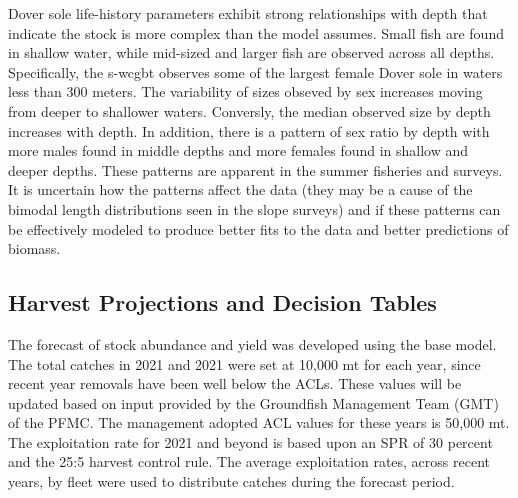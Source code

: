 \documentclass[11pt,
  english,
  a4paper,
]{article}
\begin{document}
\leavevmode\tagmcend\tagstructend\par


Dover sole life-history parameters exhibit strong relationships with depth that indicate the stock is more complex than the model assumes. Small fish are found in shallow water, while mid-sized and larger fish are observed across all depths. Specifically, the \gls{s-wcgbt} observes some of the largest female Dover sole in waters less than 300 meters. The variability of sizes obseved by sex increases moving from deeper to shallower waters. Conversly, the median observed size by depth increases with depth. In addition, there is a pattern of sex ratio by depth with more males found in middle depths and more females found in shallow and deeper depths. These patterns are apparent in the summer fisheries and surveys. It is uncertain how the patterns affect the data (they may be a cause of the bimodal length distributions seen in the slope surveys) and if these patterns can be effectively modeled to produce better fits to the data and better predictions of biomass.

\leavevmode\tagmcend\tagstructend\par


\hypertarget{harvest-projections-and-decision-tables}{%
\subsection{Harvest Projections and Decision Tables}\label{harvest-projections-and-decision-tables}}

\leavevmode\tagmcend\tagstructend


The forecast of stock abundance and yield was developed using the base model. The total catches in 2021 and 2021 were set at 10,000 mt for each year, since recent year removals have been well below the ACLs. These values will be updated based on input provided by the Groundfish Management Team (GMT) of the PFMC. The management adopted ACL values for these years is 50,000 mt. The exploitation rate for 2021 and beyond is based upon an SPR of 30 percent and the 25:5 harvest control rule. The average exploitation rates, across recent years, by fleet were used to distribute catches during the forecast period.

\leavevmode\tagmcend\tagstructend\par
\end{document}
